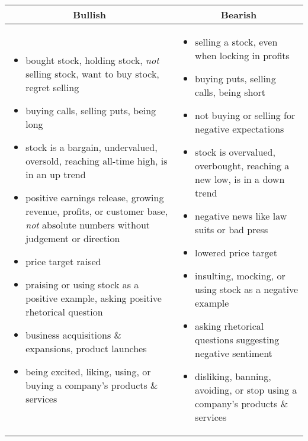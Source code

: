 \begin{table}[!ht]
\centering
\small
\begin{tabular}{p{7.5cm}p{7.5cm}}
\toprule
\multicolumn{1}{c}{\textbf{Bullish}} & \multicolumn{1}{c}{\textbf{Bearish}} \\
\midrule

\begin{itemize}[noitemsep,leftmargin=*,topsep=-12pt]
	\item bought stock, holding stock, \emph{not} selling stock, want to buy stock, regret selling
	\item buying calls, selling puts, being long
	\item stock is a bargain, undervalued, oversold, reaching all-time high, is in an up trend
	\item positive earnings release, growing revenue, profits, or customer base, \emph{not} absolute numbers without judgement or direction
	\item price target raised
	\item praising or using stock as a positive example, asking positive rhetorical question
	\item business acquisitions \& expansions, product launches
	\item being excited, liking, using, or buying a company's products \& services

\end{itemize} & \begin{itemize}[noitemsep,leftmargin=*,topsep=-12pt]
	\item selling a stock, even when locking in profits
	\item buying puts, selling calls, being short
	\item not buying or selling for negative expectations
 	\item stock is overvalued, overbought, reaching a new low, is in a down trend
 	\item negative news like law suits or bad press
 	\item lowered price target
 	\item insulting, mocking, or using stock as a negative example
 	\item asking rhetorical questions suggesting negative sentiment 
	\item disliking, banning, avoiding, or stop using a company's products \& services
\end{itemize}\\

\bottomrule
\end{tabular}
\end{table}
